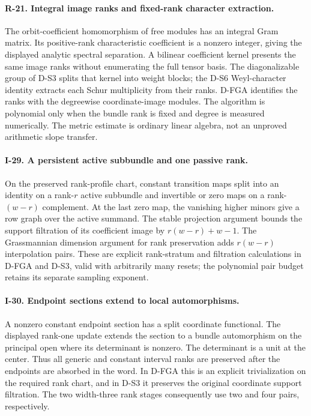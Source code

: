 \documentclass[11pt,a4paper]{article}
\theoremstyle{definition}\newtheorem{definition}{Definition}
\begin{document}
\paragraph{R-21. Integral image ranks and fixed-rank character extraction.}
The orbit-coefficient homomorphism of free modules has an integral Gram
matrix. Its positive-rank characteristic coefficient is a nonzero
integer, giving the displayed analytic spectral separation. A bilinear
coefficient kernel presents the same image ranks without enumerating
the full tensor basis. The diagonalizable group of D-S3 splits that
kernel into weight blocks; the D-S6 Weyl-character identity extracts
each Schur multiplicity from their ranks. D-FGA identifies the ranks
with the degreewise coordinate-image modules. The algorithm is
polynomial only when the bundle rank is fixed and degree is measured
numerically. The metric estimate is ordinary linear algebra, not an
unproved arithmetic slope transfer.

\paragraph{I-29. A persistent active subbundle and one passive rank.}
On the preserved rank-profile chart, constant transition maps split
into an identity on a rank-$r$ active subbundle and invertible or zero
maps on a rank-$(w-r)$ complement. At the last zero map, the vanishing
higher minors give a row graph over the active summand. The stable
projection argument bounds the support filtration of its coefficient
image by $r(w-r)+w-1$. The Grassmannian dimension argument for rank
preservation adds $r(w-r)$ interpolation pairs. These are explicit
rank-stratum and filtration calculations in D-FGA and D-S3, valid with
arbitrarily many resets; the polynomial pair budget retains its
separate sampling exponent.

\paragraph{I-30. Endpoint sections extend to local automorphisms.}
A nonzero constant endpoint section has a split coordinate functional.
The displayed rank-one update extends the section to a bundle
automorphism on the principal open where its determinant is nonzero.
The determinant is a unit at the center. Thus all generic and constant
interval ranks are preserved after the endpoints are absorbed in the
word. In D-FGA this is an explicit trivialization on the required rank
chart, and in D-S3 it preserves the original coordinate support
filtration. The two width-three rank stages consequently use two and
four pairs, respectively.
\end{document}

